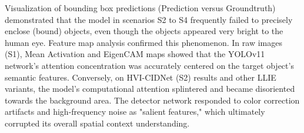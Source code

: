 \documentclass[conference]{IEEEtran}
\begin{document}
Visualization of bounding box predictions (Prediction versus Groundtruth) demonstrated that the model in scenarios S2 to S4 frequently failed to precisely enclose (bound) objects, even though the objects appeared very bright to the human eye. Feature map analysis confirmed this phenomenon. In raw images (S1), Mean Activation and EigenCAM maps showed that the YOLOv11 network's attention concentration was accurately centered on the target object's semantic features. Conversely, on HVI-CIDNet (S2) results and other LLIE variants, the model's computational attention splintered and became disoriented towards the background area. The detector network responded to color correction artifacts and high-frequency noise as "salient features," which ultimately corrupted its overall spatial context understanding.


\end{document}
